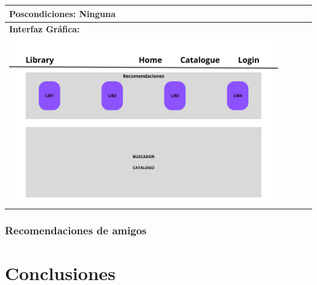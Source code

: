 \documentclass{report}
\begin{document}
\begin{center}
\begin{longtable}{|p{\linewidth}|}
                    \hline
                    \textbf{Poscondiciones:} Ninguna\\
                    \hline
                    \textbf{Interfaz Gráfica:}\\
                    \begin{minipage}{\textwidth}
                        \centering
                        \includegraphics[width=0.9\textwidth]{./img/grafico/recom_lib.png}
                    \end{minipage}\\
                    \hline
                \end{longtable}
            \end{center}
        \clearpage
        \subsection{Recomendaciones de amigos}
    \chapter{Conclusiones} 
\end{document}
